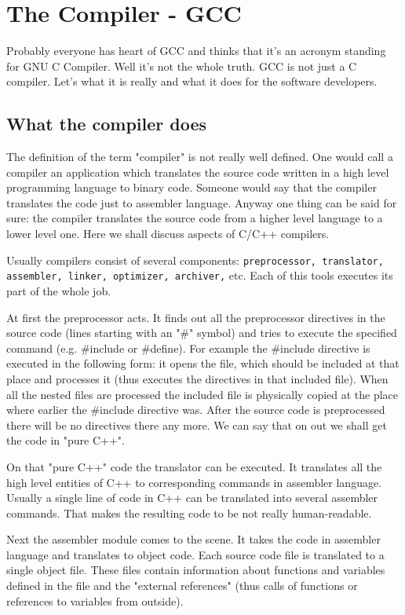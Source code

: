 
\section{The Compiler - GCC}
\label{gcc}
Probably everyone has heart of GCC and thinks that it's an acronym standing for GNU C Compiler. Well it's not the whole truth. GCC is not just a C compiler. Let's what it is really and what it does for the software developers.

\subsection{What the compiler does}
The definition of the term "compiler" is not really well defined. One would call a compiler an application which translates the source code written in a high level programming language to binary code. Someone would say that the compiler translates the code just to assembler language. Anyway one thing can be said for sure: the compiler translates the source code from a higher level language to a lower level one. Here we shall discuss aspects of C/C++ compilers.

Usually compilers consist of several components: {\tt preprocessor, translator, assembler, linker, optimizer, archiver,} etc. Each of this tools executes its part of the whole job. 

At first the preprocessor acts. It finds out all the preprocessor directives in the source code (lines starting with an "\#" symbol) and tries to execute the specified command (e.g. \#include or \#define). For example the \#include directive is executed in the following form: it opens the file, which should be included at that place and processes it (thus executes the directives in that included file). When all the nested files are processed the included file is physically copied at the place where earlier the \#include directive was. After the source code is preprocessed there will be no directives there any more. We can say that on out we shall get the code in "pure C++". 

On that "pure C++" code the translator can be executed. It translates all the high level entities of C++ to corresponding commands in assembler language. Usually a single line of code in C++ can be translated into several assembler commands. That makes the resulting code to be not really human-readable.

Next the assembler module comes to the scene. It takes the code in assembler language and translates to object code. Each source code file is translated to a single object file. These files contain information about functions and variables defined in the file and the "external references" (thus calls of functions or references to variables from outside).

